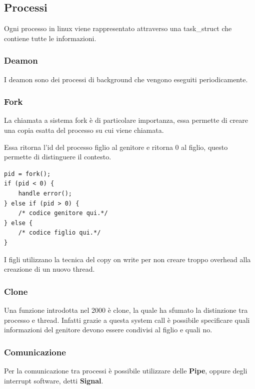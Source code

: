 \subsection{Processi}
Ogni processo in linux viene rappresentato attraverso una task\_struct che contiene tutte le informazioni.

\subsubsection{Deamon}
I deamon sono dei processi di background che vengono eseguiti periodicamente.

\subsubsection{Fork}
La chiamata a sistema fork è di particolare importanza, essa permette di creare una copia esatta del processo su cui viene chiamata.

Essa ritorna l'id del processo figlio al genitore e ritorna 0 al figlio, questo permette di distinguere il contesto.

\begin{verbatim}
pid = fork();
if (pid < 0) {
    handle error();
} else if (pid > 0) {
    /* codice genitore qui.*/
} else {
    /* codice figlio qui.*/
}
\end{verbatim}

I figli utilizzano la tecnica del copy on write per non creare troppo overhead alla creazione di un nuovo thread.

\subsubsection{Clone}
Una funzione introdotta nel 2000 è clone, la quale ha sfumato la distinzione tra processo e thread. Infatti grazie a questa system call è possibile specificare quali informazioni del genitore devono essere condivisi al figlio e quali no.

\subsubsection{Comunicazione}
Per la comunicazione tra processi è possibile utilizzare delle \textbf{Pipe}, oppure degli interrupt software, detti \textbf{Signal}.

